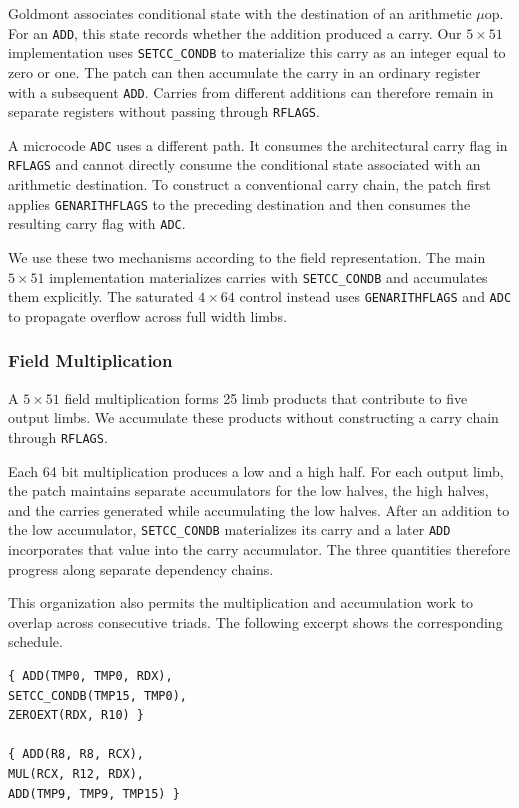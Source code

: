 \documentclass[journal=tches,submission]{iacrtrans}
\newcommand{\code}[1]{\texttt{#1}}
\begin{document}
Goldmont associates conditional state with the destination of an arithmetic $\mu$op.
For an \code{ADD}, this state records whether the addition produced a carry.
Our $5\times51$ implementation uses \code{SETCC\_CONDB} to materialize this carry as an integer equal to zero or one.
The patch can then accumulate the carry in an ordinary register with a subsequent \code{ADD}.
Carries from different additions can therefore remain in separate registers without passing through \code{RFLAGS}.

A microcode \code{ADC} uses a different path.
It consumes the architectural carry flag in \code{RFLAGS} and cannot directly consume the conditional state associated with an arithmetic destination.
To construct a conventional carry chain, the patch first applies \code{GENARITHFLAGS} to the preceding destination and then consumes the resulting carry flag with \code{ADC}.

We use these two mechanisms according to the field representation.
The main $5\times51$ implementation materializes carries with \code{SETCC\_CONDB} and accumulates them explicitly.
The saturated $4\times64$ control instead uses \code{GENARITHFLAGS} and \code{ADC} to propagate overflow across full width limbs.

\subsubsection{Field Multiplication}
\label{sec:c25519-mul}

A $5\times51$ field multiplication forms 25 limb products that contribute to five output limbs.
We accumulate these products without constructing a carry chain through \code{RFLAGS}.

Each 64 bit multiplication produces a low and a high half.
For each output limb, the patch maintains separate accumulators for the low halves, the high halves, and the carries generated while accumulating the low halves.
After an addition to the low accumulator, \code{SETCC\_CONDB} materializes its carry and a later \code{ADD} incorporates that value into the carry accumulator.
The three quantities therefore progress along separate dependency chains.

This organization also permits the multiplication and accumulation work to overlap across consecutive triads.
The following excerpt shows the corresponding schedule.

\begin{lstlisting}[caption={Two triads from the multiplication schedule. The patch materializes carries as register values instead of propagating them through \code{RFLAGS}.},label={lst:c25519-mac}]
{ ADD(TMP0, TMP0, RDX),
SETCC_CONDB(TMP15, TMP0),
ZEROEXT(RDX, R10) }

{ ADD(R8, R8, RCX),
MUL(RCX, R12, RDX),
ADD(TMP9, TMP9, TMP15) }
\end{lstlisting}
\end{document}
